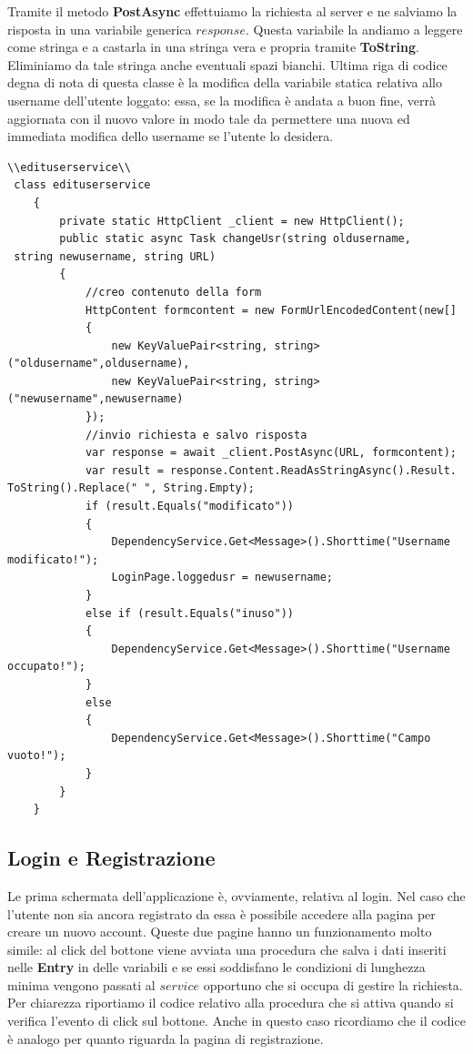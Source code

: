 \documentclass[a4paper, 50pt, twoside]{article}
\begin{document}
Tramite il metodo \textbf{PostAsync} effettuiamo la richiesta al server e ne salviamo la risposta in una variabile generica $response$. Questa variabile la andiamo a leggere come stringa e a castarla in una stringa vera e propria tramite \textbf{ToString}. Eliminiamo da tale stringa anche eventuali spazi bianchi. Ultima riga di codice degna di nota di questa classe è la modifica della variabile statica relativa allo username dell'utente loggato: essa, se la modifica è andata a buon fine, verrà aggiornata con il nuovo valore in modo tale da permettere una nuova ed immediata modifica dello username se l'utente lo desidera. 
\begin{lstlisting}
\\edituserservice\\
 class edituserservice
    {
        private static HttpClient _client = new HttpClient();
        public static async Task changeUsr(string oldusername,
 string newusername, string URL)
        {
            //creo contenuto della form
            HttpContent formcontent = new FormUrlEncodedContent(new[]
            {
                new KeyValuePair<string, string>("oldusername",oldusername),
                new KeyValuePair<string, string>("newusername",newusername)
            });
            //invio richiesta e salvo risposta
            var response = await _client.PostAsync(URL, formcontent);
            var result = response.Content.ReadAsStringAsync().Result.
ToString().Replace(" ", String.Empty);
            if (result.Equals("modificato"))
            {
                DependencyService.Get<Message>().Shorttime("Username 
modificato!");
                LoginPage.loggedusr = newusername;
            }
            else if (result.Equals("inuso"))
            {
                DependencyService.Get<Message>().Shorttime("Username 
occupato!");
            }
            else
            {
                DependencyService.Get<Message>().Shorttime("Campo vuoto!");
            }
        }
    }
\end{lstlisting}
\subsection{Login e Registrazione}
Le prima schermata dell'applicazione è, ovviamente, relativa al login. Nel caso che l'utente non sia ancora registrato da essa è possibile accedere alla pagina per creare un nuovo account. Queste due pagine hanno un funzionamento molto simile: al click del bottone viene avviata una procedura che salva i dati inseriti nelle \textbf{Entry} in delle variabili e se essi soddisfano le condizioni di lunghezza minima vengono passati al $service$ opportuno che si occupa di gestire la richiesta. 
Per chiarezza riportiamo il codice relativo alla procedura che si attiva quando si verifica l'evento di click sul bottone. Anche in questo caso ricordiamo che il codice è analogo per quanto riguarda la pagina di registrazione.
\end{document}
